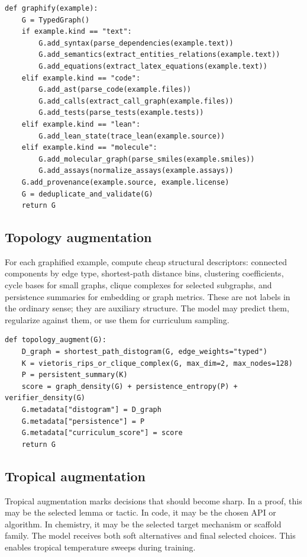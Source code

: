 \documentclass[11pt]{article}
\newcommand{\1}{\mathbf{1}}
\begin{document}
\begin{lstlisting}[caption={Universal graphification pass.}]
def graphify(example):
    G = TypedGraph()
    if example.kind == "text":
        G.add_syntax(parse_dependencies(example.text))
        G.add_semantics(extract_entities_relations(example.text))
        G.add_equations(extract_latex_equations(example.text))
    elif example.kind == "code":
        G.add_ast(parse_code(example.files))
        G.add_calls(extract_call_graph(example.files))
        G.add_tests(parse_tests(example.tests))
    elif example.kind == "lean":
        G.add_lean_state(trace_lean(example.source))
    elif example.kind == "molecule":
        G.add_molecular_graph(parse_smiles(example.smiles))
        G.add_assays(normalize_assays(example.assays))
    G.add_provenance(example.source, example.license)
    G = deduplicate_and_validate(G)
    return G
\end{lstlisting}

\subsection{Topology augmentation}

For each graphified example, compute cheap structural descriptors: connected components by edge type, shortest-path distance bins, clustering coefficients, cycle bases for small graphs, clique complexes for selected subgraphs, and persistence summaries for embedding or graph metrics. These are not labels in the ordinary sense; they are auxiliary structure. The model may predict them, regularize against them, or use them for curriculum sampling.

\begin{lstlisting}[caption={Topology augmentation and curriculum scoring.}]
def topology_augment(G):
    D_graph = shortest_path_distogram(G, edge_weights="typed")
    K = vietoris_rips_or_clique_complex(G, max_dim=2, max_nodes=128)
    P = persistent_summary(K)
    score = graph_density(G) + persistence_entropy(P) + verifier_density(G)
    G.metadata["distogram"] = D_graph
    G.metadata["persistence"] = P
    G.metadata["curriculum_score"] = score
    return G
\end{lstlisting}

\subsection{Tropical augmentation}

Tropical augmentation marks decisions that should become sharp. In a proof, this may be the selected lemma or tactic. In code, it may be the chosen API or algorithm. In chemistry, it may be the selected target mechanism or scaffold family. The model receives both soft alternatives and final selected choices. This enables tropical temperature sweeps during training.
\end{document}
